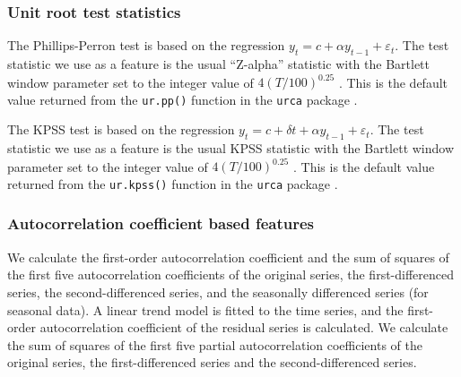 \documentclass[11pt,a4paper,]{article}
\begin{document}
\hypertarget{unit-root-test-statistics}{%
\subsubsection*{Unit root test statistics}\label{unit-root-test-statistics}}

The Phillips-Perron test is based on the regression \(y_t= c + \alpha y_{t-1}+ \varepsilon_t\). The test statistic we use as a feature is the usual ``Z-alpha'' statistic with the Bartlett window parameter set to the integer value of \(4(T/100)^{0.25}\) \autocite{Pfaff2008}. This is the default value returned from the \texttt{ur.pp()} function in the \texttt{urca} package \autocite{pfaff2016package}.

The KPSS test is based on the regression \(y_t=c+\delta t+\alpha y_{t-1}+\varepsilon_t\). The test statistic we use as a feature is the usual KPSS statistic with the Bartlett window parameter set to the integer value of \(4(T/100)^{0.25}\) \autocite{Pfaff2008}. This is the default value returned from the \texttt{ur.kpss()} function in the \texttt{urca} package \autocite{pfaff2016package}.

\hypertarget{autocorrelation-coefficient-based-features}{%
\subsubsection*{Autocorrelation coefficient based features}\label{autocorrelation-coefficient-based-features}}

We calculate the first-order autocorrelation coefficient and the sum of squares of the first five autocorrelation coefficients of the original series, the first-differenced series, the second-differenced series, and the seasonally differenced series (for seasonal data). A linear trend model is fitted to the time series, and the first-order autocorrelation coefficient of the residual series is calculated. We calculate the sum of squares of the first five partial autocorrelation coefficients of the original series, the first-differenced series and the second-differenced series.

\printbibliography
\end{document}
